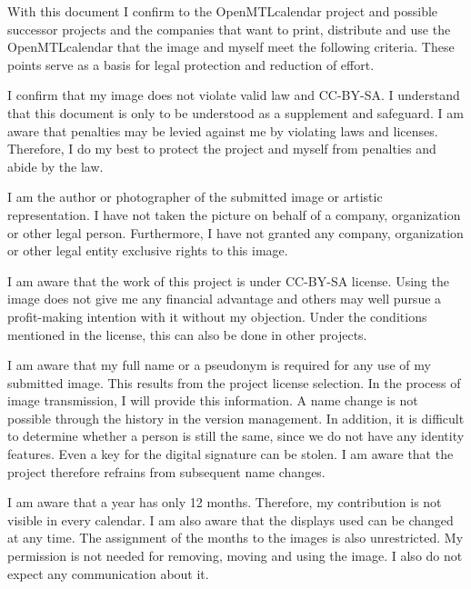 \documentclass[parskip=half]{scrreprt}
\begin{document}
 
With this document I confirm to the OpenMTLcalendar project and possible successor projects and the companies that want to print, distribute and use the OpenMTLcalendar that the image and myself meet the following criteria. These points serve as a basis for legal protection and reduction of effort.
\begin{contract}
	I confirm that my image does not violate valid law and CC-BY-SA. I understand that this document is only to be understood as a supplement and safeguard. I am aware that penalties may be levied against me by violating laws and licenses. 
	Therefore, I do my best to protect the project and myself from penalties and abide by the law.
	
	I am the author or photographer of the submitted image or artistic representation. I have not taken the picture on behalf of a company, organization or other legal person. Furthermore, I have not granted any company, organization or other legal entity exclusive rights to this image.
	
	I am aware that the work of this project is under CC-BY-SA license. Using the image does not give me any financial advantage and others may well pursue a profit-making intention with it without my objection. Under the conditions mentioned in the license, this can also be done in other projects.
	
	I am aware that my full name or a pseudonym is required for any use of my submitted image. This results from the project license selection. In the process of image transmission, I will provide this information. A name change is not possible through the history in the version management. In addition, it is difficult to determine whether a person is still the same, since we do not have any identity features. Even a key for the digital signature can be stolen. I am aware that the project therefore refrains from subsequent name changes.
	
	I am aware that a year has only 12 months. Therefore, my contribution is not visible in every calendar. I am also aware that the displays used can be changed at any time. The assignment of the months to the images is also unrestricted. My permission is not needed for removing, moving and using the image. I also do not expect any communication about it.
	

\end{contract}
\end{document}
